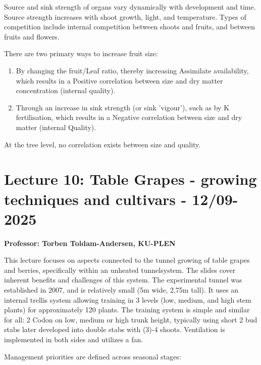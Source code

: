 \vspace{0.5em}
Source and sink strength of organs vary dynamically with development and time. Source strength increases with shoot growth, light, and temperature. Types of competition include internal competition between shoots and fruits, and between fruits and flowers.

\vspace{0.5em}
There are two primary ways to increase fruit size: 

\begin{enumerate} 
    \item By changing the fruit/Leaf ratio, thereby increasing Assimilate availability, which results in a Positive correlation between size and dry matter concentration (internal quality). 
    \item Through an increase in sink strength (or sink 'vigour'), such as by K fertilisation, which results in a Negative correlation between size and dry matter (internal Quality). 
\end{enumerate} 

\vspace{0.5em}
At the tree level, no correlation exists between size and quality.


\section{Lecture 10: Table Grapes - growing techniques and cultivars - 12/09-2025}
\textbf{Professor: Torben Toldam-Andersen, KU-PLEN}

\vspace{1em}
This lecture focuses on aspects connected to the tunnel growing of table grapes and berries, specifically within an unheated tunnelsystem. The slides cover inherent benefits and challenges of this system. The experimental tunnel was established in 2007, and is relatively small (5m wide, 2,75m tall). It uses an internal trellis system allowing training in 3 levels (low, medium, and high stem plants) for approximately 120 plants. The training system is simple and similar for all: 2 Codon on low, medium or high trunk height, typically using short 2 bud stabs later developed into double stabs with (3)-4 shoots. Ventilation is implemented in both sides and utilizes a fan.

\vspace{0.5em}
Management priorities are defined across seasonal stages: 


